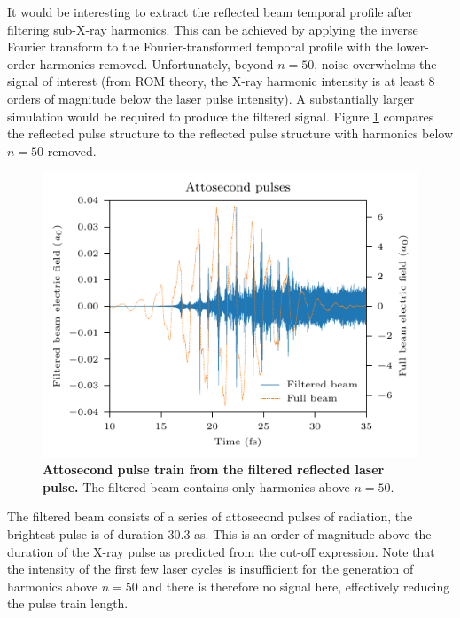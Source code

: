 It would be interesting to extract the reflected beam temporal profile after filtering sub-X-ray harmonics. This can be achieved by applying the inverse Fourier transform to the Fourier-transformed temporal profile with the lower-order harmonics removed. Unfortunately, beyond $n=50$, noise overwhelms the signal of interest (from ROM theory, the X-ray harmonic intensity is at least 8 orders of magnitude below the laser pulse intensity). A substantially larger simulation would be required to produce the filtered signal. Figure \ref{fig:orionattosecondpulse} compares the reflected pulse structure to the reflected pulse structure with harmonics below $n = 50$ removed. 
\begin{figure}
	\centering
	\includegraphics{figures/orion/orion_attosecond_pulse}
	\caption[Attosecond pulse train from the filtered reflected laser pulse.]{\textbf{Attosecond pulse train from the filtered reflected laser pulse.} The filtered beam contains only harmonics above $n = 50$.}
	\label{fig:orionattosecondpulse}
\end{figure}
The filtered beam consists of a series of attosecond pulses of radiation, the brightest pulse is of duration 30.3 as. This is an order of magnitude above the duration of the X-ray pulse as predicted from the cut-off expression. Note that the intensity of the first few laser cycles is insufficient for the generation of harmonics above $n = 50$ and there is therefore no signal here, effectively reducing the pulse train length.


